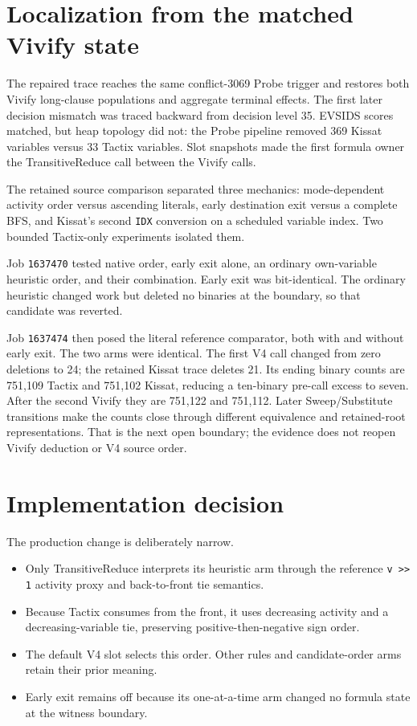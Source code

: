 \documentclass[11pt]{article}
\newcommand{\code}[1]{\texttt{#1}}
\begin{document}
\section*{Localization from the matched Vivify state}
The repaired trace reaches the same conflict-3069 Probe trigger and restores
both Vivify long-clause populations and aggregate terminal effects.  The first
later decision mismatch was traced backward from decision level 35.  EVSIDS
scores matched, but heap topology did not: the Probe pipeline removed 369
Kissat variables versus 33 Tactix variables.  Slot snapshots made the first
formula owner the TransitiveReduce call between the Vivify calls.

The retained source comparison separated three mechanics: mode-dependent
activity order versus ascending literals, early destination exit versus a
complete BFS, and Kissat's second \code{IDX} conversion on a scheduled variable
index.  Two bounded Tactix-only experiments isolated them.

Job \code{1637470} tested native order, early exit alone, an ordinary
own-variable heuristic order, and their combination.  Early exit was
bit-identical.  The ordinary heuristic changed work but deleted no binaries at
the boundary, so that candidate was reverted.

Job \code{1637474} then posed the literal reference comparator, both with and
without early exit.  The two arms were identical.  The first V4 call changed
from zero deletions to 24; the retained Kissat trace deletes 21.  Its ending
binary counts are 751,109 Tactix and 751,102 Kissat, reducing a ten-binary
pre-call excess to seven.  After the second Vivify they are 751,122 and
751,112.  Later Sweep/Substitute transitions make the counts close through
different equivalence and retained-root representations.  That is the next
open boundary; the evidence does not reopen Vivify deduction or V4 source
order.

\section*{Implementation decision}
The production change is deliberately narrow.

\begin{itemize}
\item Only TransitiveReduce interprets its heuristic arm through the reference
  \code{v >> 1} activity proxy and back-to-front tie semantics.
\item Because Tactix consumes from the front, it uses decreasing activity and
  a decreasing-variable tie, preserving positive-then-negative sign order.
\item The default V4 slot selects this order.  Other rules and candidate-order
  arms retain their prior meaning.
\item Early exit remains off because its one-at-a-time arm changed no formula
  state at the witness boundary.
\end{itemize}
\end{document}
